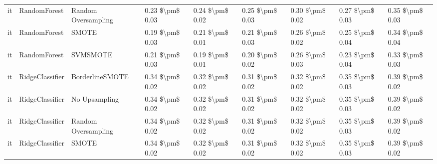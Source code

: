 \begin{tabular}{lllllllll}
      it &                    RandomForest &           Random Oversampling &     0.23 \$\textbackslash pm\$ 0.03 &           0.24 \$\textbackslash pm\$ 0.02 &       0.25 \$\textbackslash pm\$ 0.03 &        0.30 \$\textbackslash pm\$ 0.02 &                         0.27 \$\textbackslash pm\$ 0.03 &     0.35 \$\textbackslash pm\$ 0.03 \\
      it &                    RandomForest &                         SMOTE &     0.19 \$\textbackslash pm\$ 0.03 &           0.21 \$\textbackslash pm\$ 0.01 &       0.21 \$\textbackslash pm\$ 0.03 &        0.26 \$\textbackslash pm\$ 0.02 &                         0.25 \$\textbackslash pm\$ 0.04 &     0.34 \$\textbackslash pm\$ 0.04 \\
      it &                    RandomForest &                      SVMSMOTE &     0.21 \$\textbackslash pm\$ 0.03 &           0.19 \$\textbackslash pm\$ 0.01 &       0.20 \$\textbackslash pm\$ 0.02 &        0.26 \$\textbackslash pm\$ 0.03 &                         0.23 \$\textbackslash pm\$ 0.04 &     0.33 \$\textbackslash pm\$ 0.03 \\
      it &                 RidgeClassifier &               BorderlineSMOTE &     0.34 \$\textbackslash pm\$ 0.02 &           0.32 \$\textbackslash pm\$ 0.02 &       0.31 \$\textbackslash pm\$ 0.02 &        0.32 \$\textbackslash pm\$ 0.02 &                         0.35 \$\textbackslash pm\$ 0.03 &     0.39 \$\textbackslash pm\$ 0.02 \\
      it &                 RidgeClassifier &                 No Upsampling &     0.34 \$\textbackslash pm\$ 0.02 &           0.32 \$\textbackslash pm\$ 0.02 &       0.31 \$\textbackslash pm\$ 0.02 &        0.32 \$\textbackslash pm\$ 0.02 &                         0.35 \$\textbackslash pm\$ 0.03 &     0.39 \$\textbackslash pm\$ 0.02 \\
      it &                 RidgeClassifier &           Random Oversampling &     0.34 \$\textbackslash pm\$ 0.02 &           0.32 \$\textbackslash pm\$ 0.02 &       0.31 \$\textbackslash pm\$ 0.02 &        0.32 \$\textbackslash pm\$ 0.02 &                         0.35 \$\textbackslash pm\$ 0.03 &     0.39 \$\textbackslash pm\$ 0.02 \\
      it &                 RidgeClassifier &                         SMOTE &     0.34 \$\textbackslash pm\$ 0.02 &           0.32 \$\textbackslash pm\$ 0.02 &       0.31 \$\textbackslash pm\$ 0.02 &        0.32 \$\textbackslash pm\$ 0.02 &                         0.35 \$\textbackslash pm\$ 0.03 &     0.39 \$\textbackslash pm\$ 0.02 \\

\end{tabular}
